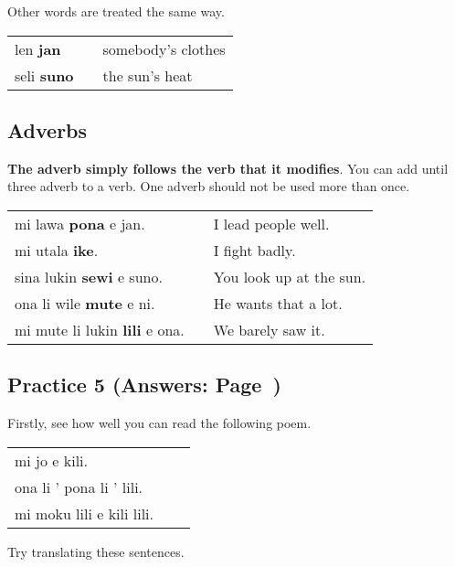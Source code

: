 Other words are treated the same way. 

\begin{supertabular}{p{5,5cm}|ll}
len \textbf{jan} && somebody's clothes \\
seli \textbf{suno} && the sun's heat \\
\end{supertabular} 

\subsection*{Adverbs}
\textbf{The adverb simply follows the verb that it modifies}. 
You can add until three adverb to a verb. 
One adverb should not be used more than once.

\begin{supertabular}{p{5,5cm}|ll}
mi lawa \textbf{pona} e jan. && I lead people well. \\
mi utala \textbf{ike}. && I fight badly. \\
sina lukin \textbf{sewi} e suno. && You look up at the sun. \\
ona li wile \textbf{mute} e ni. && He wants that a lot. \\
mi mute li lukin \textbf{lili} e ona. && We barely saw it. \\
\end{supertabular} 

\newpage
\subsection*{Practice 5 (Answers: Page~\pageref{'adjectives_compund_nouns_adverbs'})}
Firstly, see how well you can read the following poem. 

\begin{supertabular}{p{5,5cm}|ll}
mi jo e kili. && \\ %
ona li ' pona li ' lili. && \\ %
mi moku lili e kili lili. && \\ %
\end{supertabular} 

Try translating these sentences. 

